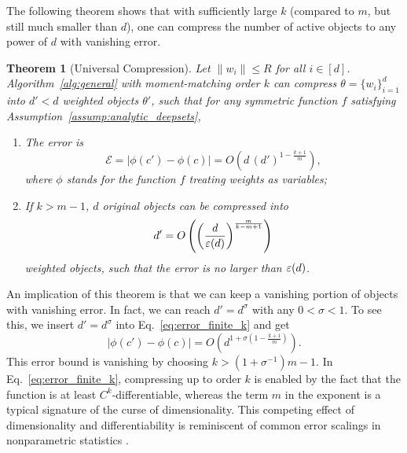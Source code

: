 \documentclass{article}
\theoremstyle{plain}
\newtheorem{theorem}{Theorem}
\def\REV#1{{\color[HTML]{000000}#1}}
\begin{document}
The following theorem shows that with sufficiently large $k$ (compared to $m$, but still much smaller than $d$), one can compress the number of active objects to any power of $d$ with vanishing error. 



\begin{theorem}[Universal Compression]\label{thm:compression_errorbound}
    Let $\|w_i\|\leq R$ for all $i\in[d]$. 
    Algorithm~\ref{alg:general} with moment-matching order $k$ can compress $\theta = \{w_i\}_{i=1}^d$ into $d'<d$ weighted objects $\theta'$, such that for any symmetric function $f$ satisfying Assumption~\ref{assump:analytic_deepsets},
    \begin{enumerate}[noitemsep,topsep=0pt, parsep=0pt,partopsep=0pt, leftmargin=20pt]
        \item The error is 
        \begin{equation}    \label{eq:error_finite_k}
            \mathcal{E} = \left| \phi(c') - \phi(c) \right| = O\left( d \, (d')^{1-\frac{k+1}{m}} \right) ,
        \end{equation}
        where $\phi$ stands for the function $f$ treating weights as variables; 
        \item If $k>m-1$, $d$ original objects can be compressed into 
        \begin{equation}    \label{eq:dstop_finite_k}
            d' = \REV{O} \left( \left(\frac{d}{\REV{\varepsilon}(d)}\right)^{\frac{m}{k-m+1}} \right)
        \end{equation}
        weighted objects, such that the error is no larger than $\REV{\varepsilon}(d)$. 
    \end{enumerate}
\end{theorem}

An implication of this theorem is that we can keep a vanishing portion of objects with vanishing error. In fact, we can reach $d'=d^{\sigma}$ with any $0<\sigma<1$. To see this, we insert $d'=d^{\sigma}$ into Eq.~\eqref{eq:error_finite_k} and get
\begin{equation}    \label{eq:error_dsigma}
    \left| \phi(c') - \phi(c) \right| = O(d^{1+\sigma(1-\frac{k+1}{m})}).
\end{equation}
This error bound is vanishing by choosing $k > (1+\sigma^{-1})m - 1$. In Eq.~\eqref{eq:error_finite_k}, compressing up to order $k$ is enabled by the fact that the function is at least $C^k$-differentiable, whereas the term $m$ in the exponent is a typical signature of the curse of dimensionality. This competing effect of dimensionality and differentiability is reminiscent of common error scalings in nonparametric statistics \citep{wasserman2006all}. 
\end{document}
